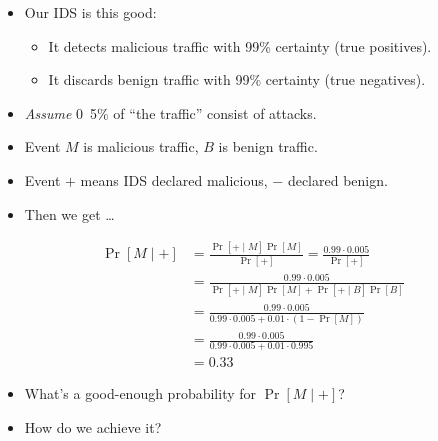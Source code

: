 \documentclass{beamer}
\begin{document}
\begin{frame}
  \begin{example}
    \begin{itemize}
      \item Our IDS is this good:
        \begin{itemize}
          \item It detects malicious traffic with \unit{99}{\%} certainty (true 
            positives).
          \item It discards benign traffic with \unit{99}{\%} certainty (true 
            negatives).
        \end{itemize}

        \pause{}

      \item \emph{Assume} \unit{0.5}{\%} of \enquote{the traffic} consist of 
        attacks.

        \pause{}

      \item Event \(M\) is malicious traffic, \(B\) is benign traffic.
      \item Event \(+\) means IDS declared malicious, \(-\) declared benign.

        \pause{}

      \item Then we get \dots
    \end{itemize}
  \end{example}
\end{frame}

\begin{frame}
  \begin{example}
    \begin{align*}
      \Pr[M\mid +] &= \frac{\Pr[+\mid M] \Pr[M]}{\Pr[+]}
      = \frac{0.99\cdot 0.005}{\Pr[+]} \\
      &= \frac{0.99\cdot 0.005}{\Pr[+\mid M] \Pr[M] + \Pr[+\mid B] \Pr[B]} 
      \\
      &= \frac{0.99\cdot 0.005}{0.99\cdot 0.005 + 0.01\cdot (1 - \Pr[M])} 
      \\
      &= \frac{0.99\cdot 0.005}{0.99\cdot 0.005 + 0.01\cdot 0.995} \\
      &= 0.33
    \end{align*}
  \end{example}
\end{frame}

\begin{frame}
  \begin{exercise}
    \begin{itemize}
      \item What's a good-enough probability for \(\Pr[M\mid +]\)?
      \item How do we achieve it?
    \end{itemize}
  \end{exercise}
\end{frame}
\end{document}
